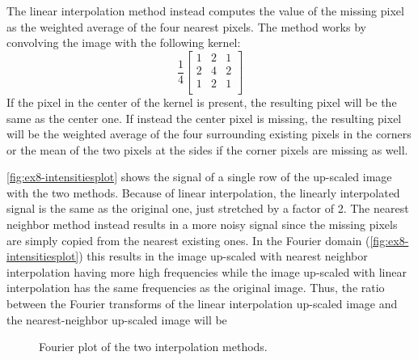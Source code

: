 \documentclass[tikz,14pt,fleqn]{article}
\begin{document}
The linear interpolation method instead computes the value of the missing pixel as the weighted average of the four nearest pixels. The method works by convolving the image with the following kernel:
$$\frac14\begin{bmatrix}
    1 & 2 & 1 \\
    2 & 4 & 2 \\
    1 & 2 & 1 \\
\end{bmatrix}$$
If the pixel in the center of the kernel is present, the resulting pixel will be the same as the center one. If instead the center pixel is missing, the resulting pixel will be the weighted average of the four surrounding existing pixels in the corners or the mean of the two pixels at the sides if the corner pixels are missing as well.

\autoref{fig:ex8-intensitiesplot} shows the signal of a single row of the up-scaled image with the two methods. Because of linear interpolation, the linearly interpolated signal is the same as the original one, just stretched by a factor of 2. The nearest neighbor method instead results in a more noisy signal since the missing pixels are simply copied from the nearest existing ones. In the Fourier domain (\autoref{fig:ex8-intensitiesplot}) this results in the image up-scaled with nearest neighbor interpolation having more high frequencies while the image up-scaled with linear interpolation has the same frequencies as the original image.
Thus, the ratio between the Fourier transforms of the linear interpolation up-scaled image and the nearest-neighbor up-scaled image will be 

\begin{figure}[h!]
    \centering
{}
\caption{Fourier plot of the two interpolation methods.}
\label{fig:ex8-intensitiesplot}
\end{figure}
\end{document}
